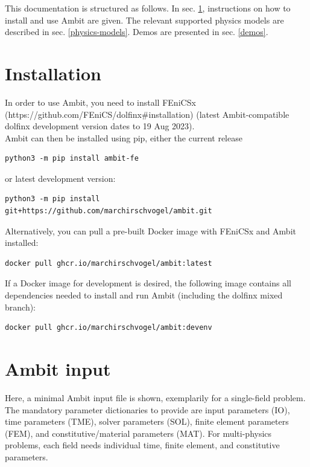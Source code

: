 \documentclass[a4paper,12pt]{report}
\begin{document}
This documentation is structured as follows. In sec. \ref{installation}, instructions on how to install and use Ambit are given. The relevant supported physics models are described in sec. \ref{physics-models}. Demos are presented in sec. \ref{demos}.


\section{Installation}\label{installation}

In order to use Ambit, you need to install FEniCSx (https://github.com/FEniCS/dolfinx\#installation) (latest Ambit-compatible dolfinx development version dates to 19 Aug 2023).\\

Ambit can then be installed using pip, either the current release
\begin{verbatim}
python3 -m pip install ambit-fe
\end{verbatim}

or latest development version:
\begin{verbatim}
python3 -m pip install git+https://github.com/marchirschvogel/ambit.git
\end{verbatim}

Alternatively, you can pull a pre-built Docker image with FEniCSx and Ambit installed:
\begin{verbatim}
docker pull ghcr.io/marchirschvogel/ambit:latest
\end{verbatim}

If a Docker image for development is desired, the following image contains all dependencies needed to install and run Ambit (including the dolfinx mixed branch):
\begin{verbatim}
docker pull ghcr.io/marchirschvogel/ambit:devenv
\end{verbatim}

\section{Ambit input}

Here, a minimal Ambit input file is shown, exemplarily for a single-field problem. The mandatory parameter dictionaries to provide are input parameters (IO), time parameters (TME), solver parameters (SOL), finite element parameters (FEM), and constitutive/material parameters (MAT). For multi-physics problems, each field needs individual time, finite element, and constitutive parameters.
\end{document}
